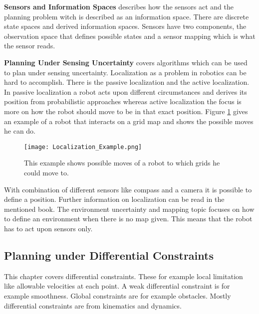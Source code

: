 \textbf{Sensors and Information Spaces} describes how the sensors act and the planning problem witch is described as an information space. There are discrete state spaces and derived information spaces. Sensors have two components, the observation space that defines possible states and a sensor mapping which is what the sensor reads. \cite{planning_algorithms_steven_m_lavalle}

\textbf{Planning Under Sensing Uncertainty} covers algorithms which can be used to plan under sensing uncertainty. Localization as a problem in robotics can be hard to accomplish. There is the passive localization and the active localization. In passive localization a robot acts upon different circumstances and derives its position from probabilistic approaches whereas active localization the focus is more on how the robot should move to be in that exact position. Figure \ref{fig:Localization Example} gives an example of a robot that interacts on a grid map and shows the possible moves he can do. \cite{planning_algorithms_steven_m_lavalle}
\begin{figure}[H]
    \centering
    \texttt{[image: Localization\_Example.png]}
    \caption{This example shows possible moves of a robot to which grids he could move to. \cite{planning_algorithms_steven_m_lavalle}}
    \label{fig:Localization Example}
\end{figure}
    
With combination of different sensors like compass and a camera it is possible to define a position. Further information on localization can be read in the mentioned book. The environment uncertainty and mapping topic focuses on how to define an environment when there is no map given. This means that the robot has to act upon sensors only. \cite{planning_algorithms_steven_m_lavalle}

\subsection{Planning under Differential Constraints}
This chapter covers differential constraints. These for example local limitation like allowable velocities at each point. A weak differential constraint is for example smoothness. Global constraints are for example obstacles. Mostly differential constraints are from kinematics and dynamics.

